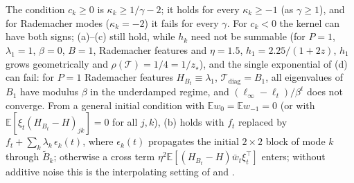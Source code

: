 \documentclass[11pt]{article}
\theoremstyle{remark}
\newcommand{\E}{\mathbb{E}}
\newcommand{\T}{\mathcal T}
\begin{document}
The condition $c_k\ge0$ is $\kappa_k\ge1/\gamma-2$; it holds for every $\kappa_k\ge-1$ (as $\gamma\ge1$), and for Rademacher modes ($\kappa_k=-2$) it fails for every $\gamma$. For $c_k<0$ the kernel can have both signs; (a)--(c) still hold, while $h_k$ need not be summable (for $P=1$, $\lambda_1=1$, $\beta=0$, $B=1$, Rademacher features and $\eta=1.5$, $\widehat h_1=2.25/(1+2z)$, $h_1$ grows geometrically and $\rho(\T)=1/4=1/z_\star$), and the single exponential of (d) can fail: for $P=1$ Rademacher features $H_{B_t}\equiv\lambda_1$, $\T_{\mathrm{diag}}=B_1$, all eigenvalues of $B_1$ have modulus $\beta$ in the underdamped regime, and $(\ell_\infty-\ell_t)/\beta^t$ does not converge. From a general initial condition with $\E w_0=\E w_{-1}=0$ (or with $\E[\xi_t(H_{B_t}-H)_{jk}]=0$ for all $j,k$), (b) holds with $f_t$ replaced by $f_t+\sum_k\lambda_k\,\epsilon_k(t)$, where $\epsilon_k(t)$ propagates the initial $2\times2$ block of mode $k$ through $\widetilde B_k$; otherwise a cross term $\eta^2\E[(H_{B_t}-H)\bar w_t\xi_t^\top]$ enters; without additive noise this is the interpolating setting of \citet{lee2022minibatch} and \citet{everett2026sparse}.
\end{document}
